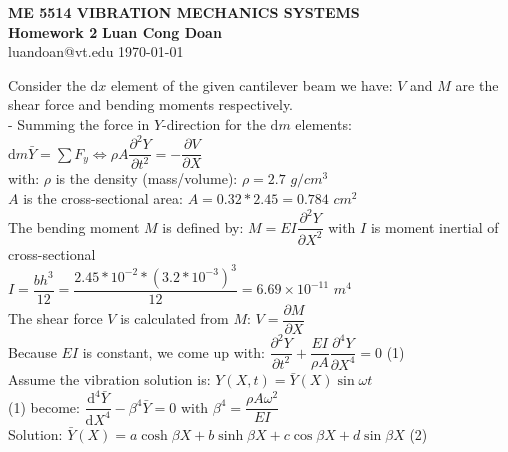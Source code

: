 \documentclass[14pt,a4paper]{article}
\begin{document}
\label{cover}
\begin{center}
	\vspace*{3cm}
	\large{\textbf{ME 5514 VIBRATION MECHANICS SYSTEMS \\ Homework 2}}
	\vfill
	\textbf{Luan Cong Doan} \\ luandoan@vt.edu
	\vfill
	\today
\end{center}
\pagebreak

\label{Answer Sheet}
\label{Vibration Mechanics}
\doublespacing
	Consider the $\mathrm{d}x$ element of the given cantilever beam we have: $V$ and $M$ are the shear force and bending moments respectively.\\
	- Summing the force in $Y$-direction for the $\mathrm{d}m$ elements: $\mathrm{d}m\bar{Y} = \sum F_y \Leftrightarrow \rho A\dfrac{\partial^2Y}{\partial t^2} = -\dfrac{\partial V}{\partial X} $\\
	with: $\rho$ is the density (mass/volume): $\rho = 2.7$  $g/cm^3$ \\
	\hspace*{0.8cm} $A$ is the cross-sectional area: $A = 0.32*2.45 = 0.784$ $cm^2$ \\
	The bending moment $M$ is defined by: $M = EI\dfrac{\partial^2Y}{\partial X^2}$ with $I$ is moment inertial of cross-sectional\\
	\hspace*{1cm}	$I = \dfrac{bh^3}{12} = \dfrac{2.45*10^{-2}*(3.2*10^{-3})^3}{12} = 6.69\times 10^{-11}$ $m^4$\\
	The shear force $V$ is calculated from $M$: $V = \dfrac{\partial M}{\partial X} $\\
	Because $EI$ is constant, we come up with: $\dfrac{\partial^2Y}{\partial t^2} + \dfrac{EI}{\rho A}\dfrac{\partial^4Y}{\partial X^4} = 0$ \hspace{2cm} (1)\\
	Assume the vibration solution is: $Y(X,t) = \bar{Y}(X)\sin\omega t$\\
	(1) become: $\dfrac{\mathrm{d}^4\bar{Y}}{\mathrm{d}X^4} - \beta^4\bar{Y} = 0$ \hspace{2cm} with $ \beta^4 = \dfrac{\rho A\omega^2}{EI}$\\
	Solution: $\bar{Y}(X) = a\cosh \beta X + b\sinh \beta X + c\cos \beta X + d\sin \beta X $ \hspace{2cm} (2)
	
\end{document}
